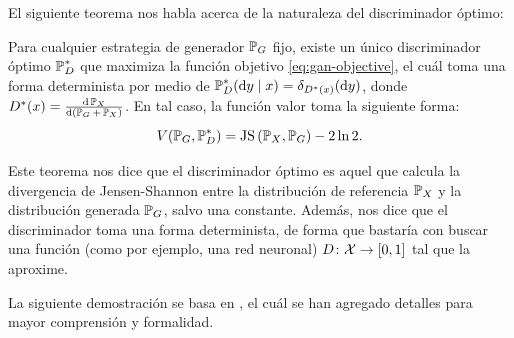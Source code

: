 {{%

El siguiente teorema nos habla acerca de la naturaleza del discriminador óptimo:

\begin{theorem}
    \label{thm:gan-optimal-discriminator}
    Para cualquier estrategia de generador $\Prob_G$ fijo, existe un único discriminador óptimo $\Prob_D^\ast$ que maximiza la función objetivo \eqref{eq:gan-objective}, el cuál toma una forma determinista por medio de $\Prob_D^\ast(\dd y \mid x) = \delta_{D^\ast(x)}(\dd y)$, donde $D^\ast(x) = \dv{\Prob_X}{(\Prob_G+\Prob_X)}$. En tal caso, la función valor toma la siguiente forma:
    \begin{equation}
        V(\Prob_G, \Prob_D^\ast) = \JS{\Prob_X}{\Prob_G} - 2 \ln 2.
    \end{equation}
\end{theorem}

Este teorema nos dice que el discriminador óptimo es aquel que calcula la divergencia de Jensen-Shannon entre la distribución de referencia $\Prob_X$ y la distribución generada $\Prob_G$, salvo una constante. Además, nos dice que el discriminador toma una forma determinista, de forma que bastaría con buscar una función (como por ejemplo, una red neuronal) $D\colon\mathcal{X}\to [0, 1]$ tal que la aproxime.

La siguiente demostración se basa en \cite{wikipediagan}, el cuál se han agregado detalles para mayor comprensión y formalidad.

}}
